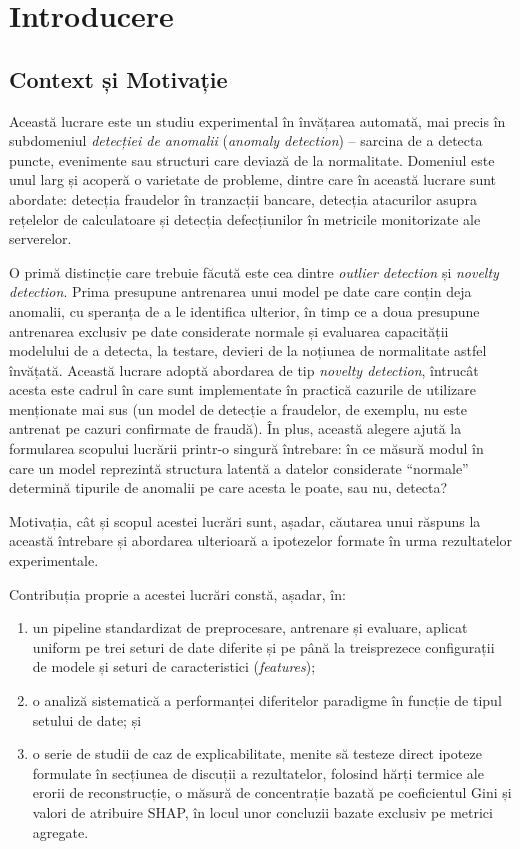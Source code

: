 \chapter{Introducere}
\label{ch:introducere}

\section{Context și Motivație}

Această lucrare este un studiu experimental în învățarea automată, mai precis în subdomeniul \emph{detecției de anomalii} (\emph{anomaly detection}) -- sarcina de a detecta puncte, evenimente sau structuri care deviază de la normalitate. Domeniul este unul larg și acoperă o varietate de probleme, dintre care în această lucrare sunt abordate: detecția fraudelor în tranzacții bancare, detecția atacurilor asupra rețelelor de calculatoare și detecția defecțiunilor în metricile monitorizate ale serverelor.

O primă distincție care trebuie făcută este cea dintre \emph{outlier detection} și \emph{novelty detection}. Prima presupune antrenarea unui model pe date care conțin deja anomalii, cu speranța de a le identifica ulterior, în timp ce a doua presupune antrenarea exclusiv pe date considerate normale și evaluarea capacității modelului de a detecta, la testare, devieri de la noțiunea de normalitate astfel învățată. Această lucrare adoptă abordarea de tip \emph{novelty detection}, întrucât acesta este cadrul în care sunt implementate în practică cazurile de utilizare menționate mai sus (un model de detecție a fraudelor, de exemplu, nu este antrenat pe cazuri confirmate de fraudă). În plus, această alegere ajută la formularea scopului lucrării printr-o singură întrebare: în ce măsură modul în care un model reprezintă structura latentă a datelor considerate \enquote{normale} determină tipurile de anomalii pe care acesta le poate, sau nu, detecta?

Motivația, cât și scopul acestei lucrări sunt, așadar, căutarea unui răspuns la această întrebare și abordarea ulterioară a ipotezelor formate în urma rezultatelor experimentale.

Contribuția proprie a acestei lucrări constă, așadar, în:

\begin{enumerate}
    \item un pipeline standardizat de preprocesare, antrenare și evaluare, aplicat uniform pe trei seturi de date diferite și pe până la treisprezece configurații de modele și seturi de caracteristici (\emph{features});
    \item o analiză sistematică a performanței diferitelor paradigme în funcție de tipul setului de date; și
    \item o serie de studii de caz de explicabilitate, menite să testeze direct ipoteze formulate în secțiunea de discuții a rezultatelor, folosind hărți termice ale erorii de reconstrucție, o măsură de concentrație bazată pe coeficientul Gini și valori de atribuire SHAP, în locul unor concluzii bazate exclusiv pe metrici agregate.
\end{enumerate}

